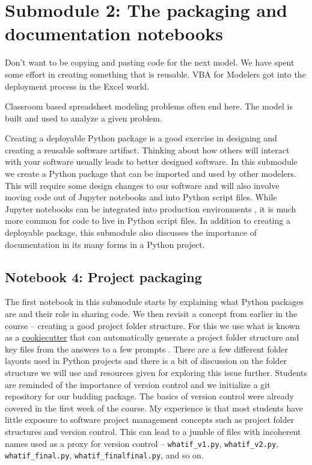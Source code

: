 \documentclass[ited,blindrev]{informs3}              %
\newcommand{\code}[1]{\texttt{#1}}
\begin{document}
\section{Submodule 2: The packaging and documentation notebooks}


Don't want to be copying and pasting code for the next model. We have spent some effort in creating something that is reusable.
VBA for Modelers got into the deployment process in the Excel world.

Classroom based spreadsheet modeling problems often end here. The model is built and used to analyze a given problem.

Creating a deployable Python package is a good exercise in designing and creating a reusable software artifact. Thinking about how others will interact with your software usually leads to better designed software.  In this submodule we create a Python package that can be imported and used by other modelers. This will require some design changes to our software and will also involve moving code out of Jupyter notebooks and into Python script files. While Jupyter notebooks can be integrated into production environments \cite{netflix}, it is much more common for code to live in Python script files. In addition to creating a deployable package, this submodule also discusses the importance of documentation in its many forms in a Python project.


\subsection{Notebook 4: Project packaging}

The first notebook in this submodule starts by explaining what Python packages are and their role in sharing code. We then revisit a concept from earlier in the course -- creating a good project folder structure. For this we use what is known as a \href{https://cookiecutter.readthedocs.io/en/stable/}{cookiecutter} that can automatically generate a project folder structure and key files from the answers to a few prompts \cite{CookiecutterBetterProject}. There are a few different folder layouts used in Python projects and there is a bit of discussion on the folder structure we will use and resources given for exploring this issue further. Students are reminded of the importance of version control and we initialize a git repository for our budding package. The basics of version control were already covered in the first week of the course. My experience is that most students have little exposure to software project management concepts such as project folder structures and version control. This can lead to a jumble of files with incoherent names used as a proxy for version control -- \code{whatif\_v1.py}, \code{whatif\_v2.py}, \code{whatif\_final.py}, \code{whatif\_finalfinal.py}, and so on.
\end{document}
